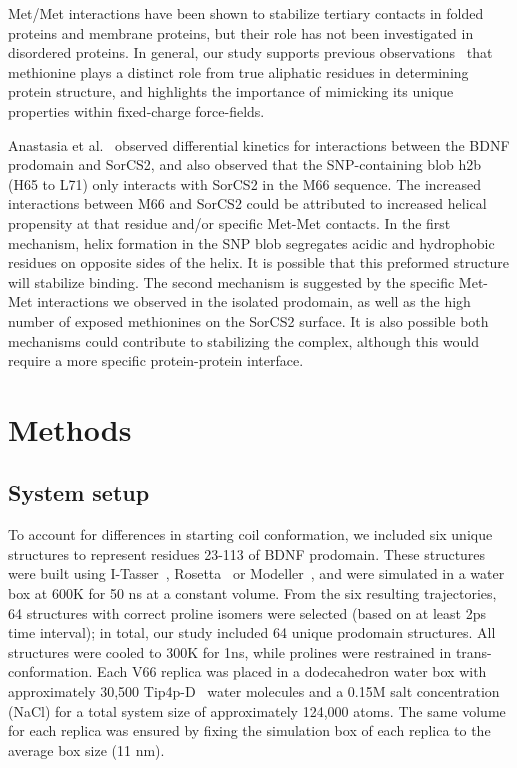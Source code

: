 \documentclass[10pt,letterpaper]{article}
\begin{document}
Met/Met interactions have been shown to stabilize tertiary contacts in folded proteins and membrane proteins, but their role has not been investigated in disordered proteins. In general, our study supports previous observations~\cite{Gomez-Tamayo2016, Lim2019} that methionine plays a distinct role from true aliphatic residues in determining protein structure, and highlights the importance of mimicking its unique properties within fixed-charge force-fields. 

Anastasia et al.~\cite{Anastasia2013} observed differential kinetics for interactions between the BDNF prodomain and SorCS2, and also observed that the SNP-containing blob h2b (H65 to L71) only interacts with SorCS2 in the M66 sequence. The increased interactions between M66 and SorCS2 could be attributed to increased helical propensity at that residue and/or specific Met-Met contacts. In the first mechanism, helix formation in the SNP blob segregates acidic and hydrophobic residues on opposite sides of the helix. It is possible that this preformed structure will stabilize binding. The second mechanism is suggested by the specific Met-Met interactions we observed in the isolated prodomain, as well as the high number of exposed methionines on the SorCS2 surface. It is also possible both mechanisms could contribute to stabilizing the complex, although this would require a more specific protein-protein interface. 

\section*{Methods}

\subsection*{System setup} To account for differences in starting coil conformation, we included six unique structures to represent residues 23-113 of BDNF prodomain. These structures were built using I-Tasser~\cite{Yang2014,Roy2010,Bioinformatics}, Rosetta~\cite{Kim2004} or Modeller~\cite{Sali1993a}, and were simulated in a water box at 600K for 50 ns at a constant volume. From the six resulting trajectories, 64 structures with correct proline isomers were selected (based on at least 2ps time interval); in total, our study included 64 unique prodomain structures. All structures were cooled to 300K for 1ns, while prolines were restrained in trans-conformation. Each V66 replica was placed in a dodecahedron water box with approximately 30,500 Tip4p-D~\cite{Piana2015} water molecules and a 0.15M salt concentration (NaCl) for a total system size of approximately 124,000 atoms. The same volume for each replica was ensured by fixing the simulation box of each replica to the average box size (11 nm).
\end{document}

